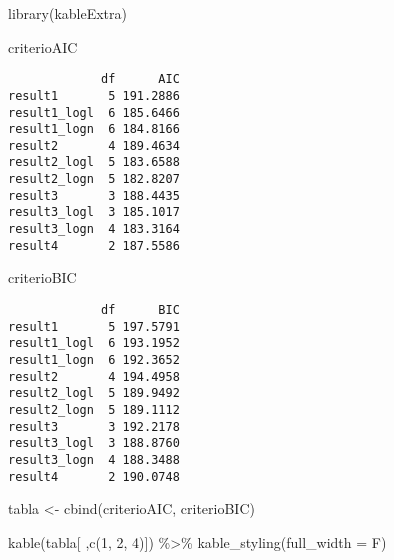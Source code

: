 \documentclass[
]{article}
\newenvironment{Shaded}{\begin{snugshade}}{\end{snugshade}}
\newcommand{\AttributeTok}[1]{\textcolor[rgb]{0.77,0.63,0.00}{#1}}
\newcommand{\DecValTok}[1]{\textcolor[rgb]{0.00,0.00,0.81}{#1}}
\newcommand{\FunctionTok}[1]{\textcolor[rgb]{0.00,0.00,0.00}{#1}}
\newcommand{\NormalTok}[1]{#1}
\newcommand{\OtherTok}[1]{\textcolor[rgb]{0.56,0.35,0.01}{#1}}
\newcommand{\SpecialCharTok}[1]{\textcolor[rgb]{0.00,0.00,0.00}{#1}}
\begin{document}
\begin{Shaded}
\begin{Highlighting}[]
\FunctionTok{library}\NormalTok{(kableExtra)}

\NormalTok{criterioAIC}
\end{Highlighting}
\end{Shaded}

\begin{verbatim}
             df      AIC
result1       5 191.2886
result1_logl  6 185.6466
result1_logn  6 184.8166
result2       4 189.4634
result2_logl  5 183.6588
result2_logn  5 182.8207
result3       3 188.4435
result3_logl  3 185.1017
result3_logn  4 183.3164
result4       2 187.5586
\end{verbatim}

\begin{Shaded}
\begin{Highlighting}[]
\NormalTok{criterioBIC}
\end{Highlighting}
\end{Shaded}

\begin{verbatim}
             df      BIC
result1       5 197.5791
result1_logl  6 193.1952
result1_logn  6 192.3652
result2       4 194.4958
result2_logl  5 189.9492
result2_logn  5 189.1112
result3       3 192.2178
result3_logl  3 188.8760
result3_logn  4 188.3488
result4       2 190.0748
\end{verbatim}

\begin{Shaded}
\begin{Highlighting}[]
\NormalTok{tabla }\OtherTok{\textless{}{-}} \FunctionTok{cbind}\NormalTok{(criterioAIC, criterioBIC)}

\FunctionTok{kable}\NormalTok{(tabla[ ,}\FunctionTok{c}\NormalTok{(}\DecValTok{1}\NormalTok{, }\DecValTok{2}\NormalTok{, }\DecValTok{4}\NormalTok{)]) }\SpecialCharTok{\%\textgreater{}\%}
  \FunctionTok{kable\_styling}\NormalTok{(}\AttributeTok{full\_width =}\NormalTok{ F)}
\end{Highlighting}
\end{Shaded}
\end{document}
